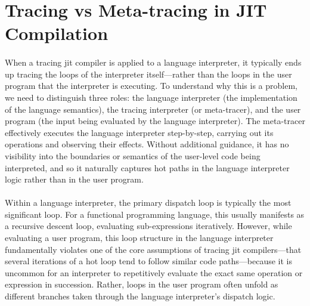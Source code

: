 


    \section[\texorpdfstring{Tracing vs Meta-tracing in JIT Compilation}{Tracing vs Meta-tracing}]{Tracing vs Meta-tracing in JIT Compilation}
    \label{section:tracing-meta-tracing}

        \paragraph{}%
            When a tracing \gls{jit} compiler is applied to a language interpreter, it typically ends up tracing the loops of the interpreter itself—rather than the loops in the user program that the interpreter is executing. To understand why this is a problem, we need to distinguish three roles: the language interpreter (the implementation of the language semantics), the tracing interpreter (or meta-tracer), and the user program (the input being evaluated by the language interpreter). The meta-tracer effectively executes the language interpreter step-by-step, carrying out its operations and observing their effects. Without additional guidance, it has no visibility into the boundaries or semantics of the user-level code being interpreted, and so it naturally captures hot paths in the language interpreter logic rather than in the user program.

        \paragraph{}%
            Within a language interpreter, the primary dispatch loop is typically the most significant loop. For a functional programming language, this usually manifests as a recursive descent loop, evaluating sub-expressions iteratively. However, while evaluating a user program, this loop structure in the language interpreter fundamentally violates one of the core assumptions of tracing \gls{jit} compilers—that several iterations of a hot loop tend to follow similar code paths—because it is uncommon for an interpreter to repetitively evaluate the exact same operation or expression in succession. Rather, loops in the user program often unfold as different branches taken through the language interpreter’s dispatch logic.

